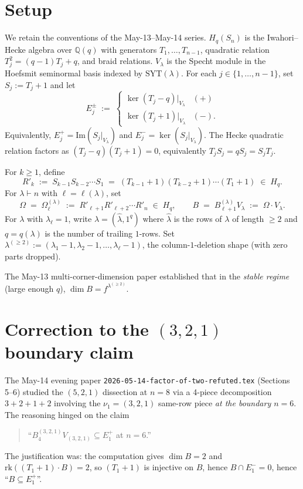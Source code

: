 \documentclass[11pt]{article}
\theoremstyle{definition}
\newcommand{\Hq}{H_q}
\newcommand{\Sn}{S_n}
\newcommand{\Vlam}{V_\lambda}
\newcommand{\Bdec}{B_{\ell+1}^{(\lambda)}}
\newcommand{\Om}{\Omega}
\newcommand{\hatl}{\widehat\lambda}
\newcommand{\decl}{\lambda^{(\ge 2)}}
\begin{document}
\section{Setup}\label{sec:setup}

We retain the conventions of the May-13--May-14 series.  $H_q(\Sn)$
is the Iwahori--Hecke algebra over $\mathbb{Q}(q)$ with generators
$T_1, \ldots, T_{n-1}$, quadratic relation $T_j^2 = (q-1) T_j + q$,
and braid relations.  $V_\lambda$ is the Specht module in the
Hoefsmit seminormal basis indexed by $\mathrm{SYT}(\lambda)$.  For
each $j \in \{1, \ldots, n-1\}$, set $S_j := T_j + 1$ and let
\[
   E_j^\pm \;:=\; \begin{cases}
     \ker(T_j - q)|_{\Vlam} & (+) \\
     \ker(T_j + 1)|_{\Vlam} & (-).
   \end{cases}
\]
Equivalently, $E_j^+ = \mathrm{Im}(S_j|_{\Vlam})$ and
$E_j^- = \ker(S_j|_{\Vlam})$.  The Hecke quadratic relation factors
as $(T_j - q)(T_j + 1) = 0$, equivalently $T_j S_j = q S_j = S_j T_j$.

For $k \ge 1$, define
\[
   R'_k \;:=\; S_{k-1} S_{k-2} \cdots S_1
            \;=\; (T_{k-1}{+}1)(T_{k-2}{+}1)\cdots(T_1{+}1) \;\in\; \Hq.
\]
For $\lambda \vdash n$ with $\ell = \ell(\lambda)$, set
\[
   \Om \;=\; \Om^{(\lambda)}_\ell \;:=\;
   R'_{\ell+1} R'_{\ell+2} \cdots R'_n \;\in\; \Hq,
   \qquad
   B \;=\; \Bdec \Vlam \;:=\; \Om \cdot \Vlam.
\]
For $\lambda$ with $\lambda_\ell = 1$, write $\lambda = (\hatl, 1^q)$
where $\hatl$ is the rows of $\lambda$ of length $\ge 2$ and
$q = q(\lambda)$ is the number of trailing $1$-rows.  Set
$\decl := (\lambda_1{-}1, \lambda_2{-}1, \ldots, \lambda_\ell{-}1)$,
the column-$1$-deletion shape (with zero parts dropped).

The May-13 multi-corner-dimension paper established that in the
\emph{stable regime} (large enough $q$), $\dim B = f^\decl$.

\section{Correction to the $(3, 2, 1)$ boundary claim}\label{sec:correction}

The May-14 evening paper
\texttt{2026-05-14-factor-of-two-refuted.tex} (Sections 5--6) studied
the $(5, 2, 1)$ dissection at $n = 8$ via a 4-piece decomposition
$3 + 2 + 1 + 2$ involving the $\nu_1 = (3, 2, 1)$ same-row piece
\emph{at the boundary $n = 6$}.  The reasoning hinged on the claim
\begin{quote}
``$B^{(3, 2, 1)}_4 V_{(3, 2, 1)} \subseteq E_1^+$ at $n = 6$.''
\end{quote}
The justification was: the computation gives $\dim B = 2$ and
$\mathrm{rk}((T_1{+}1) \cdot B) = 2$, so $(T_1{+}1)$ is injective on
$B$, hence $B \cap E_1^- = 0$, hence ``$B \subseteq E_1^+$''.
\end{document}
